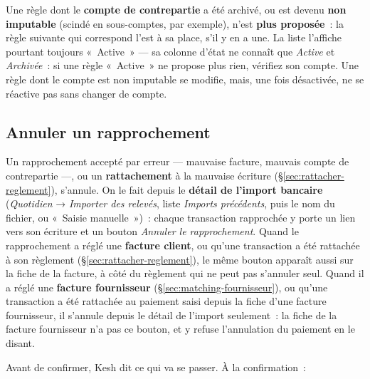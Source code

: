 \documentclass[a4paper,11pt,oneside]{article}
\begin{document}
Une règle dont le \textbf{compte de contrepartie} a été archivé, ou est devenu \textbf{non imputable} (scindé en sous-comptes, par exemple), n'est \textbf{plus proposée}~: la règle suivante qui correspond l'est à sa place, s'il y en a une. La liste l'affiche pourtant toujours «~Active~» --- sa colonne d'état ne connaît que \emph{Active} et \emph{Archivée}~: si une règle «~Active~» ne propose plus rien, vérifiez son compte. Une règle dont le compte est non imputable se modifie, mais, une fois désactivée, ne se réactive pas sans changer de compte.

\subsection{Annuler un rapprochement}\label{sec:annuler-rapprochement}

Un rapprochement accepté par erreur --- mauvaise facture, mauvais compte de contrepartie ---,
ou un \textbf{rattachement} à la mauvaise écriture (\S\ref{sec:rattacher-reglement}),
s'annule. On le fait depuis le \textbf{détail de l'import bancaire} (\emph{Quotidien} → \emph{Importer des relevés}, liste
\emph{Imports précédents}, puis le nom du fichier, ou «~Saisie manuelle~»)~: chaque transaction rapprochée y porte un lien vers son écriture et un
bouton \emph{Annuler le rapprochement}. Quand le rapprochement a réglé une \textbf{facture
client}, ou qu'une transaction a été rattachée à son règlement
(\S\ref{sec:rattacher-reglement}), le même bouton apparaît aussi sur la fiche de la facture, à
côté du règlement qui ne peut pas s'annuler seul. Quand il a réglé une \textbf{facture
fournisseur} (\S\ref{sec:matching-fournisseur}), ou qu'une transaction a été rattachée au
paiement saisi depuis la fiche d'une facture fournisseur, il s'annule depuis le détail de
l'import seulement~: la fiche de la facture fournisseur n'a pas ce bouton, et y refuse
l'annulation du paiement en le disant.

Avant de confirmer, Kesh dit ce qui va se passer. À la confirmation~:
\end{document}
